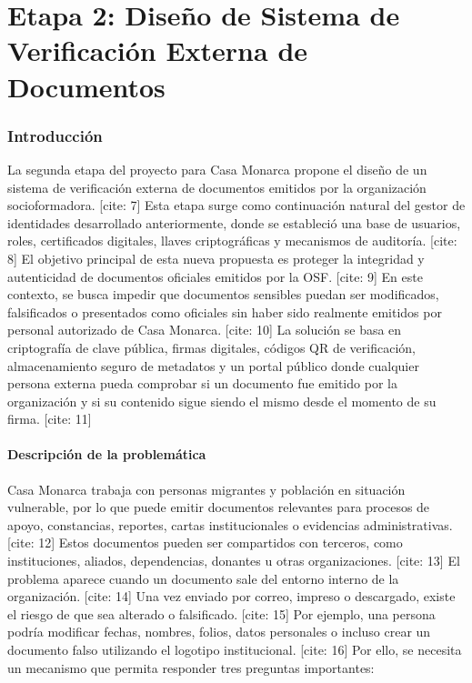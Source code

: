 \documentclass[10pt]{article} [cite: 1]
\begin{document}
\tableofcontents
\newpage
\part{Etapa 2: Diseño de Sistema de Verificación Externa de Documentos}

\begin{abstract}
    En el presente reporte se detalla el desarrollo de la etapa 2, la cual consiste en la integración de un sistema de verificación de documentos emitidos por los colaboradores de Casa Monarca. [cite: 6]
\end{abstract}

\section{Introducción}

La segunda etapa del proyecto para Casa Monarca propone el diseño de un sistema de verificación externa de documentos emitidos por la organización socioformadora. [cite: 7] Esta etapa surge como continuación natural del gestor de identidades desarrollado anteriormente, donde se estableció una base de usuarios, roles, certificados digitales, llaves criptográficas y mecanismos de auditoría. [cite: 8] El objetivo principal de esta nueva propuesta es proteger la integridad y autenticidad de documentos oficiales emitidos por la OSF. [cite: 9] En este contexto, se busca impedir que documentos sensibles puedan ser modificados, falsificados o presentados como oficiales sin haber sido realmente emitidos por personal autorizado de Casa Monarca. [cite: 10] La solución se basa en criptografía de clave pública, firmas digitales, códigos QR de verificación, almacenamiento seguro de metadatos y un portal público donde cualquier persona externa pueda comprobar si un documento fue emitido por la organización y si su contenido sigue siendo el mismo desde el momento de su firma. [cite: 11]

\subsection{Descripción de la problemática}

Casa Monarca trabaja con personas migrantes y población en situación vulnerable, por lo que puede emitir documentos relevantes para procesos de apoyo, constancias, reportes, cartas institucionales o evidencias administrativas. [cite: 12] Estos documentos pueden ser compartidos con terceros, como instituciones, aliados, dependencias, donantes u otras organizaciones. [cite: 13] El problema aparece cuando un documento sale del entorno interno de la organización. [cite: 14] Una vez enviado por correo, impreso o descargado, existe el riesgo de que sea alterado o falsificado. [cite: 15] Por ejemplo, una persona podría modificar fechas, nombres, folios, datos personales o incluso crear un documento falso utilizando el logotipo institucional. [cite: 16] Por ello, se necesita un mecanismo que permita responder tres preguntas importantes:
\end{document}
